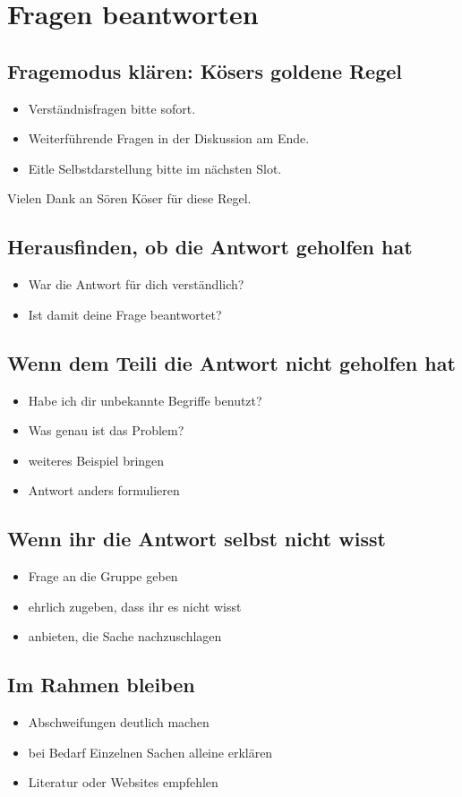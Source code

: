 \section{Fragen beantworten}
\label{fragen-beantworten}

\subsection{Fragemodus klären: Kösers goldene Regel}
\begin{itemize}
  \item Verständnisfragen bitte sofort.
  \item Weiterführende Fragen in der Diskussion am Ende.
  \item Eitle Selbstdarstellung bitte im nächsten Slot.
\end{itemize}

Vielen Dank an Sören Köser für diese Regel.


\subsection{Herausfinden, ob die Antwort geholfen hat}
\begin{itemize}
  \item War die Antwort für dich verständlich?
  \item Ist damit deine Frage beantwortet?
\end{itemize}

\subsection{Wenn dem Teili die Antwort nicht geholfen hat}
\begin{itemize}
  \item Habe ich dir unbekannte Begriffe benutzt?
  \item Was genau ist das Problem?
  \item weiteres Beispiel bringen
  \item Antwort anders formulieren
\end{itemize}

\subsection{Wenn ihr die Antwort selbst nicht wisst}
\begin{itemize}
  \item Frage an die Gruppe geben
  \item ehrlich zugeben, dass ihr es nicht wisst
  \item anbieten, die Sache nachzuschlagen
\end{itemize}

\subsection{Im Rahmen bleiben}
\begin{itemize}
  \item Abschweifungen deutlich machen
  \item bei Bedarf Einzelnen Sachen alleine erklären
  \item Literatur oder Websites empfehlen
\end{itemize}
